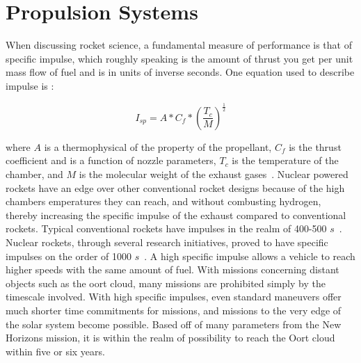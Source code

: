 \documentclass{article}
\begin{document}
\section{Propulsion Systems}

When discussing rocket science, a fundamental measure of performance is that of specific impulse, which roughly speaking is the amount of thrust you get per unit mass flow of fuel and is in units of inverse seconds. One equation used to describe impulse is :

\begin{equation}
\label{eq1}
I_{sp} = A*C_f*\left(\frac{T_c}{M}\right)^{\frac{1}{2}}
\end{equation}

where $A$ is a thermophysical of the property of the propellant, $C_f$ is the thrust coefficient and is a function of nozzle parameters, $T_c$ is the temperature of the chamber, and $M$ is the molecular weight of the exhaust gases~\cite{buden2011space}. Nuclear powered rockets have an edge over other conventional rocket designs because of the high chambers emperatures they can reach, and without combusting hydrogen, thereby increasing the specific impulse of the exhaust compared to conventional rockets. Typical conventional rockets have impulses in the realm of 400-500 $s$~\cite{buden2011space}. Nuclear rockets, through several research initiatives, proved to have specific impulses on the order of 1000 $s$~\cite{matthews1993fuels}. A high specific impulse allows a vehicle to reach higher speeds with the same amount of fuel. With missions concerning distant objects such as the oort cloud, many missions are prohibited simply by the timescale involved. With high specific impulses, even standard maneuvers offer much shorter time commitments for missions, and missions to the very edge of the solar system become possible. Based off of many parameters from the New Horizons mission, it is within the realm of possibility to reach the Oort cloud within five or six years.
\end{document}
